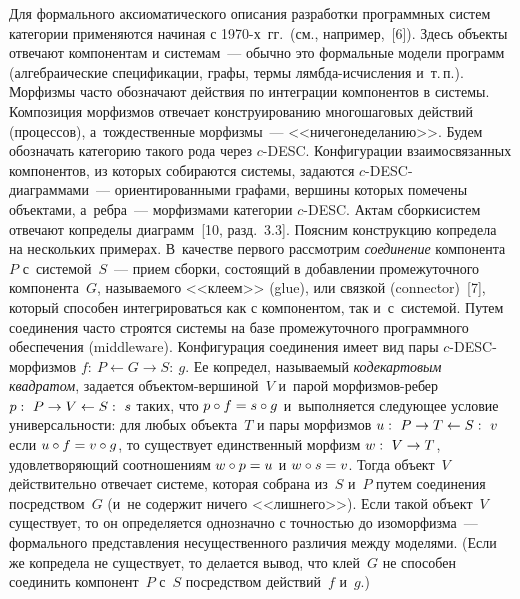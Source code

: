 \begin{multicols}{2}
 Для формального аксиоматического описания разработки программных
систем категории применяются начиная с 1970-х~гг.\ (см., например,~[6]).
Здесь объекты отвечают компонентам и системам~--- обычно это формальные
модели программ (ал\-геб\-ра\-и\-че\-ские спецификации, графы, термы
 лямб\-да-ис\-чис\-ле\-ния и~т.\,п.). Морфизмы часто обозначают действия по
интеграции компонентов в системы. Композиция морфизмов отвечает
конструированию многошаговых действий (процессов), а~тож\-де\-ст\-вен\-ные
морфизмы~--- <<ни\-че\-го\-не\-де\-ла\-нию>>. Будем обозначать категорию
такого рода через $c$-DESC. Конфигурации взаимосвязанных компонентов,
из которых собираются системы, задаются $c$-DESC-диа\-грам\-ма\-ми~---
ориентированными графами, вершины которых помечены объектами, а~ребра~---
морфизмами категории $c$-DESC. Актам сборки\linebreak систем отвечают копределы
диаграмм~[10, разд.~3.3]. Поясним конструкцию копредела на нескольких
примерах. В~качестве первого рассмотрим \textit{соединение} компонента~$P$
с~системой~$S$~--- прием сборки, состоящий в добавлении промежуточного
компонента~$G$, называемого <<клеем>> (glue), или связкой (connector)~[7],
который способен интегрироваться как с компонентом, так и~с~системой.
Путем соединения часто строятся системы на базе промежуточного
про\-грамм\-но\-го обес\-пе\-че\-ния
(middleware). Конфигурация соединения имеет вид пары
 $c$-DESC-морфизмов $f:\ P\leftarrow G\to S:\ g$. Ее копредел, на\-зы\-ва\-емый
\textit{кодекартовым квадратом}, задается объ\-ек\-том-вер\-ши\-ной~$V$
и~парой мор\-физ\-мов-ре\-бер $p:\ P\hm\to V\leftarrow S:\ s$ таких, что $p\circ f
\hm= s \circ g$ и~выполняется следующее условие универсальности: для любых
объекта~$T$ и пары морфизмов $u:\ P\hm\to T\leftarrow S:\ v$ если
$u \circ f\hm= v \circ g$, то существует единственный морфизм $w:\ V\hm\to T$,
удовлетворяющий соотношениям $w \circ p \hm= u$ и $w \circ s \hm= v$. Тогда
объект~$V$ действительно отвечает системе, которая собрана из~$S$ и~$P$
путем соединения посредством~$G$ (и~не содержит ничего <<лишнего>>).
Если такой объект~$V$ существует, то он определяется однозначно с
точностью до изоморфизма~--- формального представления несущественного
различия между моделями. (Если же копредела не существует, то делается
вывод, что клей~$G$ не способен соединить компонент~$P$ с~$S$
посредством действий~$f$ и~$g$.)
\vspace*{12pt}
 \begin{center}
 \mbox{%
 \epsfxsize=67.149mm
 }
 \end{center}
 \vspace*{12pt}


\end{multicols}
